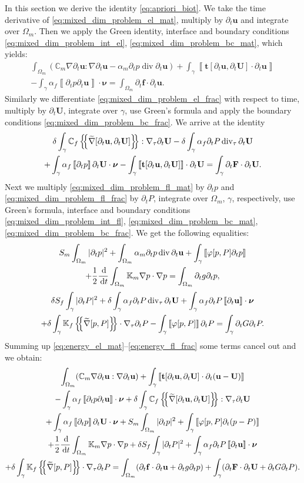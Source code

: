 \documentclass[a4paper]{article}
\numberwithin{equation}{section}
\def\agrad{\widetilde\nabla}
\def\avg#1{\left\{\mskip-5mu\left\{#1\right\}\mskip-5mu\right\}}
\def\CC{\tn C}
\def\d {\,{\rm d}}
\def\ddt#1{\frac{\d #1}{\d t}}
\def\div{\operatorname{div}}
\def\dt{\prtl_t}
\def\FF{\vc F}
\def\ff{\vc f}
\def\jmp#1{\left\llbracket #1 \right\rrbracket}
\def\nnu{\boldsymbol\nu}
\def\prtl{\partial}
\def\tn#1{{\mathbb{#1}}}    %
\def\ttraction{\vc t}
\def\U{\vc U}
\def\uu{\vc u}
\def\vc#1{\mathbf{#1}}     %
\newcommand{\ml}[1]{\begin{multline}#1\end{multline}}
\begin{document}
In this section we derive the identity \eqref{eq:apriori_biot}.
We take the time derivative of \eqref{eq:mixed_dim_problem_el_mat}, multiply by $\dt\uu$ and integrate over $\Omega_m$.
Then we apply the Green identity, interface and boundary conditions \eqref{eq:mixed_dim_problem_int_el}, \eqref{eq:mixed_dim_problem_bc_mat}, which yields:
\ml{ \label{eq:energy_el_mat} \int_{\Omega_m}(\CC_m\nabla\dt\uu:\nabla\dt\uu - \alpha_m\dt p \div\dt\uu) + \int_\gamma\jmp{\ttraction[\dt\uu,\dt\U]\cdot\dt\uu}\\
- \int_\gamma\alpha_f\jmp{\dt p \dt\uu}\cdot\nnu
= \int_{\Omega_m}\dt\ff\cdot\dt\uu. }
Similarly we differentiate \eqref{eq:mixed_dim_problem_el_frac} with respect to time, multiply by $\dt\U$, integrate over $\gamma$, use Green's formula and apply the boundary conditions \eqref{eq:mixed_dim_problem_bc_frac}.
We arrive at the identity
\ml{ \label{eq:energy_el_frac} \delta\int_\gamma\CC_f\avg{\agrad[\dt\uu,\dt\U]}:\nabla_\tau\dt\U - \delta\int_\gamma\alpha_f\dt P\div_\tau\dt\U\\
+ \int_\gamma\alpha_f\jmp{\dt p}\dt\U\cdot\nnu - \int_\gamma\jmp{\ttraction[\dt\uu,\dt\U]}\cdot\dt\U = \int_\gamma\dt\FF\cdot\dt\U. }
Next we multiply \eqref{eq:mixed_dim_problem_fl_mat} by $\dt p$ and \eqref{eq:mixed_dim_problem_fl_frac} by $\dt P$, integrate over $\Omega_m$, $\gamma$, respectively, use Green's formula, interface and boundary conditions \eqref{eq:mixed_dim_problem_int_fl}, \eqref{eq:mixed_dim_problem_bc_mat}, \eqref{eq:mixed_dim_problem_bc_frac}.
We get the following equalities:
\ml{ \label{eq:energy_fl_mat} S_m\int_{\Omega_m}|\dt p|^2 + \int_{\Omega_m}\alpha_m\dt p\div\dt\uu + \int_\gamma\jmp{\varphi[p,P]\dt p}\\
+ \frac12\ddt{}\int_{\Omega_m}\tn K_m\nabla p\cdot\nabla p
= \int_{\Omega_m}\dt g \dt p, }
\ml{ \label{eq:energy_fl_frac} \delta S_f\int_\gamma|\dt P|^2 + \delta\int_\gamma\alpha_f\dt P\div_\tau\dt\U + \int_\gamma\alpha_f\dt P\jmp{\dt\uu}\cdot\nnu\\
+ \delta\int_\gamma\tn K_f\avg{\agrad[p,P]}\cdot\nabla_\tau\dt P 
- \int_\gamma\jmp{\varphi[p,P]}\dt P = \int_\gamma \dt G \dt P. }
Summing up \eqref{eq:energy_el_mat}--\eqref{eq:energy_fl_frac} some terms cancel out and we obtain:
\ml{ \label{eq:energy_sum} \int_{\Omega_m}(\CC_m\nabla\dt\uu:\nabla\dt\uu ) + \int_\gamma\jmp{\ttraction[\dt\uu,\dt\U]\cdot\dt(\uu-\U)}\\
- \int_\gamma\alpha_f\jmp{\dt p \dt\uu}\cdot\nnu
+ \delta\int_\gamma\CC_f\avg{\agrad[\dt\uu,\dt\U]}:\nabla_\tau\dt\U\\
+ \int_\gamma\alpha_f\jmp{\dt p}\dt\U\cdot\nnu
+ S_m\int_{\Omega_m}|\dt p|^2 + \int_\gamma\jmp{\varphi[p,P]\dt(p-P)}\\
+ \frac12\ddt{}\int_{\Omega_m}\tn K_m\nabla p\cdot\nabla p
+ \delta S_f\int_\gamma|\dt P|^2 + \int_\gamma\alpha_f\dt P\jmp{\dt\uu}\cdot\nnu\\
+ \delta\int_\gamma\tn K_f\avg{\agrad[p,P]}\cdot\nabla_\tau\dt P 
= \int_{\Omega_m}(\dt\ff\cdot\dt\uu + \dt g \dt p) + \int_\gamma(\dt\FF\cdot\dt\U + \dt G \dt P). }
\end{document}
